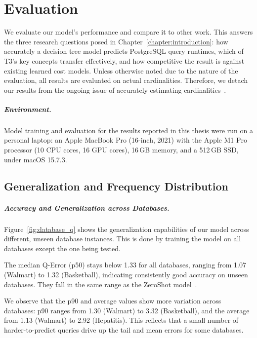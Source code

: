 
\chapter{Evaluation}\label{chapter:evaluation}

We evaluate our model's performance and compare it to other work.
This answers the three research questions posed in Chapter~\ref{chapter:introduction}: how accurately a decision tree model predicts PostgreSQL query runtimes, which of T3's key concepts transfer effectively, and how competitive the result is against existing learned cost models.
Unless otherwise noted due to the nature of the evaluation, all results are evaluated on actual cardinalities.
Therefore, we detach our results from the ongoing issue of accurately estimating cardinalities~\parencite{leis2018job}.

\paragraph{Environment.}
Model training and evaluation for the results reported in this thesis were run on a personal laptop: an Apple MacBook Pro (16-inch, 2021) with the Apple M1 Pro processor (10 CPU cores, 16 GPU cores), 16\,GB memory, and a 512\,GB SSD, under macOS 15.7.3.

\section{Generalization and Frequency Distribution}

\paragraph{Accuracy and Generalization across Databases.}
Figure~\ref{fig:database_q} shows the generalization capabilities of our model across different, unseen database instances.
This is done by training the model on all databases except the one being tested.

The median Q-Error (p50) stays below 1.33 for all databases,
ranging from 1.07 (Walmart) to 1.32 (Basketball),
indicating consistently good accuracy on unseen databases.
They fall in the same range as the ZeroShot model~\parencite{zeroshot}.

We observe that the p90 and average values show more variation across databases:
p90 ranges from 1.30 (Walmart) to 3.32 (Basketball),
and the average from 1.13 (Walmart) to 2.92 (Hepatitis).
This reflects that a small number of harder-to-predict queries
drive up the tail and mean errors for some databases.

